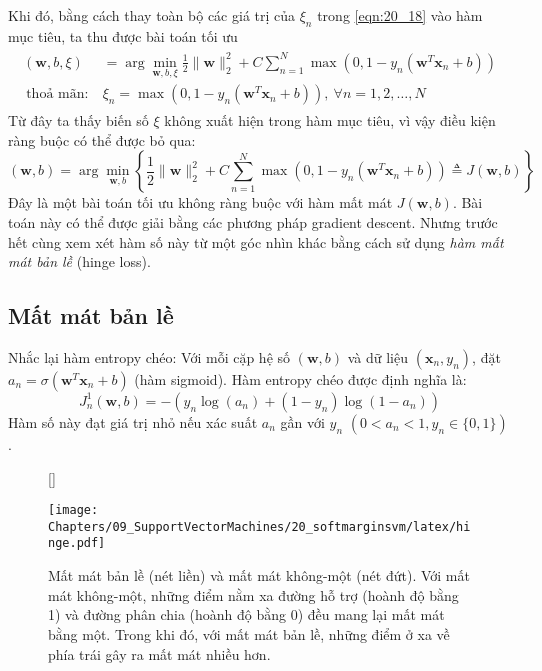 Khi đó, bằng cách thay toàn bộ các giá trị của $\xi_n$ trong \eqref{eqn:20_18}
vào hàm mục tiêu, ta thu được bài toán tối ưu
\begin{eqnarray}
\label{eqn:20_19}
\begin{aligned}
(\mathbf{w}, b, \xi) &= \arg \min_{\mathbf{w}, b, \xi}
\frac{1}{2}{\|\mathbf{w}\|_2^2} + C \sum_{n=1}^N \max(0, 1 - y_n(\mathbf{w}^T\mathbf{x}_n + b)) \\\
\text{thoả mãn:}~ & \xi_n = \max(0, 1 - y_n(\mathbf{w}^T\mathbf{x}_n + b)), ~\forall n = 1, 2, \dots, N
\end{aligned}
\end{eqnarray}
Từ đây ta thấy biến số $\xi$ không xuất hiện trong hàm mục tiêu, vì vậy điều kiện ràng buộc có thể được bỏ qua:
\begin{equation}
\label{eqn:20_20}
(\mathbf{w}, b)= \arg \min_{\mathbf{w}, b} \left\{
\frac{1}{2}{\|\mathbf{w}\|_2^2} + C \sum_{n=1}^N \max(0, 1 -
y_n(\mathbf{w}^T\mathbf{x}_n + b)) \triangleq J(\mathbf{w}, b) \right\}
\end{equation}
Đây là một bài toán tối ưu không ràng buộc với hàm mất mát $J(\mathbf{w}, b)$.
Bài toán này có thể được giải bằng các phương pháp gradient descent. Nhưng trước
hết cùng xem xét hàm số này từ một góc nhìn khác bằng
cách sử dụng \textit{hàm mất mát bản lề} (hinge loss).

\subsection{Mất mát bản lề}
Nhắc lại hàm entropy chéo: Với mỗi cặp hệ số $(\mathbf{w},
b)$ và dữ liệu $(\mathbf{x}_n, y_n)$, đặt $a_n = \sigma(\mathbf{w}^T\mathbf{x}_n +
b)$ (hàm sigmoid). Hàm
entropy chéo được định nghĩa là:
\begin{equation} J_n^1(\mathbf{w}, b)
= -(y_n \log(a_n) + (1 - y_n) \log(1 - a_n))
\end{equation}
Hàm số này đạt giá trị nhỏ nếu xác suất $a_n$
gần với $y_n$ $(0 < a_n < 1, y_n \in \{0, 1\})$.

\begin{figure}[t]
[\FBwidth]
{\caption{
Mất mát bản lề (nét liền) và mất mát không-một (nét đứt). Với mất mát không-một, những
điểm nằm xa đường hỗ trợ (hoành độ bằng 1) và đường phân chia (hoành độ bằng 0) đều mang lại mất mát bằng một. Trong khi đó, với mất mát bản lề, những điểm ở xa về
phía trái gây ra mất mát nhiều hơn. }
\label{fig:20_3}}
{ %
\texttt{[image: Chapters/09\_SupportVectorMachines/20\_softmarginsvm/latex/hinge.pdf]}
}
\end{figure}




